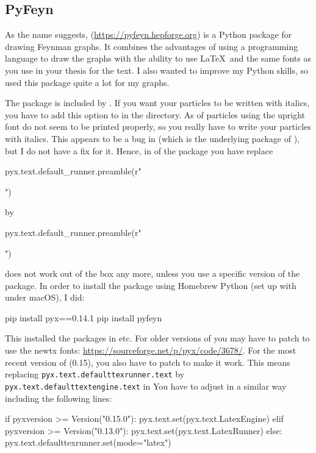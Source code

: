 \subsection{PyFeyn}%
\label{sec:fig:pyfeyn}

As the name suggests,  (\url{https://pyfeyn.hepforge.org})
is a Python package for drawing Feynman graphs.
It combines the advantages of using a programming language to draw the graphs
with the ability to use \LaTeX\ and the same fonts as you use in your thesis for the text.
I also wanted to improve my Python skills, so used this package quite a lot for my graphs.

The package  is included by .
If you want your particles to be written with italics,
you have to add this option to  in the  directory.
As of  particles using the upright font do not seem to be printed properly,
so you really have to write your particles with italics.
This appears to be a bug in  (which is the underlying package of ),
but I do not have a fix for it.
Hence, in  of the package you have replace
\begin{bashlisting}
pyx.text.default_runner.preamble(r"\usepackage{hepnicenames}")
\end{bashlisting}
by
\begin{bashlisting}
pyx.text.default_runner.preamble(r"\usepackage[italic]{hepnicenames}")
\end{bashlisting}

 does not work out of the box any more,
unless you use a specific version of the  package.
In order to install the package using Homebrew Python (set up with  under macOS), I did:
\begin{bashlisting}
pip install pyx==0.14.1
pip install pyfeyn
\end{bashlisting}
This installed the packages in  etc.
For older versions of  you may have to patch 
to use the newtx fonts: \url{https://sourceforge.net/p/pyx/code/3678/}.
For the most recent version of  (0.15), you also have to patch  to make it work.
This means replacing
\verb+pyx.text.defaulttexrunner.text+ by
\verb+pyx.text.defaulttextengine.text+
in 
You have to adjust  in a similar way including the following lines:
\begin{bashlisting}
if pyxversion >= Version("0.15.0"):
    pyx.text.set(pyx.text.LatexEngine)
elif pyxversion >= Version("0.13.0"):
    pyx.text.set(pyx.text.LatexRunner)
else:
    pyx.text.defaulttexrunner.set(mode="latex")
\end{bashlisting}

